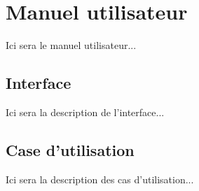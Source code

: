 \section{Manuel utilisateur}
Ici sera le manuel utilisateur...
\subsection{Interface}
Ici sera la description de l'interface...
\subsection{Case d'utilisation}
Ici sera la description des cas d'utilisation...
